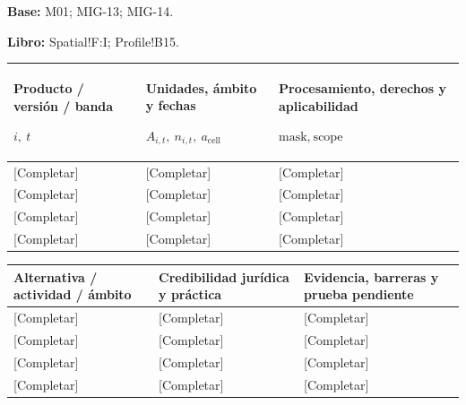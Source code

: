 \textbf{Base:} M01; MIG-13; MIG-14.\par
\textbf{Libro:} Spatial!F:I; Profile!B15.\par\endgroup
{\sffamily\fontsize{8.3}{10.3}\selectfont\begin{longtable}{@{}P{47.84mm} P{56.09mm} P{61.14mm}@{}}
\toprule
\textbf{Producto / versión / banda}\par {\normalfont\fontsize{8.2}{10}\selectfont $i,\ t$} & \textbf{Unidades, ámbito y fechas}\par {\normalfont\fontsize{8.2}{10}\selectfont $A_{i,t},\ n_{i,t},\ a_{\mathrm{cell}}$} & \textbf{Procesamiento, derechos y aplicabilidad}\par {\normalfont\fontsize{8.2}{10}\selectfont $\text{mask},\ \text{scope}$}\\\midrule\endhead
\rule{0pt}{7.7mm}[Completar] & [Completar] & [Completar]\\\hline
\rule{0pt}{7.7mm}[Completar] & [Completar] & [Completar]\\\hline
\rule{0pt}{7.7mm}[Completar] & [Completar] & [Completar]\\\hline
\rule{0pt}{7.7mm}[Completar] & [Completar] & [Completar]\\\hline
\end{longtable}}
{\sffamily\fontsize{8.3}{10.3}\selectfont\begin{longtable}{@{}P{56.09mm} P{49.49mm} P{59.39mm}@{}}
\toprule
\textbf{Alternativa / actividad / ámbito} & \textbf{Credibilidad jurídica y práctica} & \textbf{Evidencia, barreras y prueba pendiente}\\\midrule\endhead
\rule{0pt}{7.7mm}[Completar] & [Completar] & [Completar]\\\hline
\rule{0pt}{7.7mm}[Completar] & [Completar] & [Completar]\\\hline
\rule{0pt}{7.7mm}[Completar] & [Completar] & [Completar]\\\hline
\rule{0pt}{7.7mm}[Completar] & [Completar] & [Completar]\\\hline
\end{longtable}}
